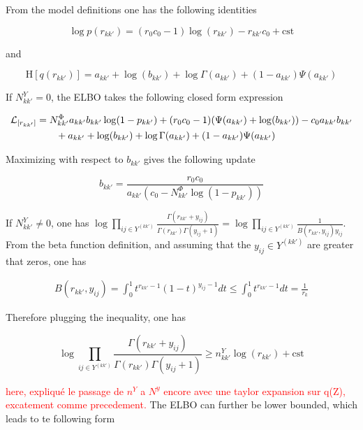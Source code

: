 From the model definitions one has the following identities

\begin{equation*}
\log p(r_{kk'}) = (r_0 c_0-1)\log(r_{kk'}) - r_{kk'} c_0 + \mathrm{cst}
\end{equation*}

and 

\begin{equation*}
\textrm{H}[q(r_{kk'})] = a_{kk'} + \log(b_{kk'}) +\log \Gamma(a_{kk'}) + (1-a_{kk'})\Psi(a_{kk'})
\end{equation*}

If $N^Y_{kk'}=0$, the ELBO takes the following closed form expression

\begin{align*}
\mathcal{L}_{[r_{kk'}]} &= N^\Phi_{kk'} a_{kk'} b_{kk'} \log(1-p_{kk'}) + (r_0 c_0-1 )(\Psi(a_{kk'}) + \log(b_{kk'})) -c_0 a_{kk'} b_{kk'}   \\
&\qquad + a_{kk'} + \log(b_{kk'}) +\log \Gamma(a_{kk'}) + (1-a_{kk'})\Psi(a_{kk'})
\end{align*}

Maximizing with respect to $b_{kk'}$ gives the following update

\begin{equation}\label{eq:update1}
b_{kk'} = \frac{r_0 c_0}{a_{kk'} (c_0 - N^\Phi_{kk'} \log(1-p_{kk'}))}
\end{equation}

If $N^Y_{kk'} \neq 0$, one has $\log \prod_{ij\in Y^{(kk')}} \frac{\Gamma(r_{kk'}+y_{ij})}{\Gamma(r_{kk'}) \Gamma(y_{ij}+1) } = \log \prod_{ij\in Y^{(kk')}} \frac{1}{B(r_{kk'}, y_{ij})y_{ij}}$. From the beta function definition, and assuming that the $y_{ij} \in Y^{(kk')}$ are greater that zeros, one has

\begin{align*}
B(r_{kk'}, y_{ij}) = \int_0^1 t^{r_{kk'}-1} (1-t)^{y_{ij}-1} dt  \leq \int_0^1 t^{r_{kk'}-1} dt = \frac{1}{r_k}
\end{align*}

Therefore plugging the inequality, one has

\begin{equation*}
\log \prod_{ij\in Y^{(kk')}} \frac{\Gamma(r_{kk'}+y_{ij})}{\Gamma(r_{kk'}) \Gamma(y_{ij}+1) } \geq n^Y_{kk'} \log(r_{kk'}) + \mathrm{cst}
\end{equation*}


\textcolor{red}{here, expliqué le passage de $n^Y$ a $N^y$ encore avec une taylor expansion sur q(Z), excatement comme precedement.}
The ELBO can further be lower bounded, which leads to te following form


